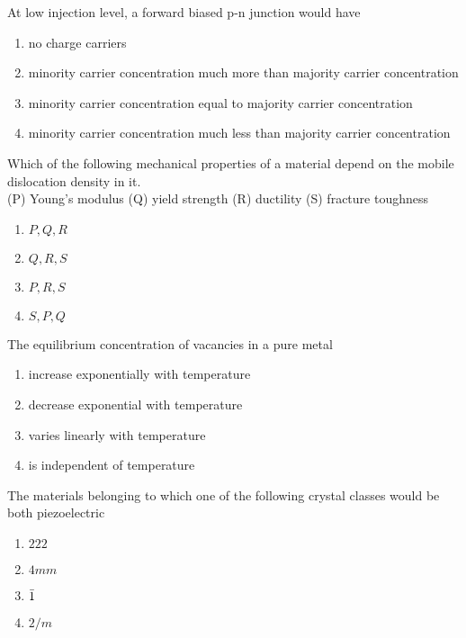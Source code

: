 \item At low injection level, a forward biased p-n junction would have 
\begin{enumerate}
    \item no charge carriers
    \item minority carrier concentration much more than majority carrier concentration
    \item minority carrier concentration  equal to majority carrier concentration
    \item minority carrier concentration much less than majority carrier concentration\\
\end{enumerate}
\item Which of the following mechanical properties of a material depend on the mobile dislocation density in it.\\
(P) Young's modulus (Q) yield strength (R) ductility (S) fracture toughness
\begin{enumerate}
    \item $P,Q,R$
    \item $Q,R,S$
    \item $P,R,S$
    \item $S,P,Q$
\end{enumerate}
\item The equilibrium concentration of vacancies in a pure metal 
\begin{enumerate}
    \item increase exponentially with temperature 
    \item decrease exponential with temperature 
    \item varies linearly with temperature 
    \item is independent of temperature 
\end{enumerate}
\item The materials belonging to which one of the following crystal classes would be both piezoelectric
\begin{enumerate}
    \item $222$
    \item $4mm$
    \item $\Bar{1}$
    \item $2/m$
    
\end{enumerate}